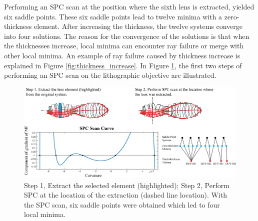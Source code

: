 Performing an SPC scan at the position where the sixth lens is extracted, yielded six saddle points. These six saddle points lead to twelve minima with a zero-thickness element. After increasing the thickness, the twelve systems converge into four solutions. The reason for the convergence of the solutions is that when the thicknesses increase, local minima can encounter ray failure or merge with other local minima. An example of ray failure caused by thickness increase is explained in Figure \ref{fig:thickness_increase}. In Figure \ref{fig: litho_step1_2}, the first two steps of performing an SPC scan on the lithographic objective are illustrated.

\begin{figure}[h!]
    \centering
    \includegraphics[width=\textwidth]{chapter-4/figures/Litho_Step1_2.png}
    \caption{Step 1, Extract the selected element (highlighted); Step 2, Perform SPC at the location of the extraction (dashed line location). With the SPC scan, six saddle points were obtained which led to four local minima. }
    \label{fig: litho_step1_2}
\end{figure}

